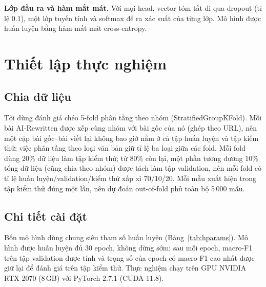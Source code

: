 \documentclass[conference,a4paper]{IEEEtran}
\begin{document}
\textbf{Lớp đầu ra và hàm mất mát.} Với mọi head, vector tóm tắt đi qua dropout (tỉ lệ 0.1), một lớp tuyến tính và softmax để ra xác suất của từng lớp. Mô hình được huấn luyện bằng hàm mất mát cross-entropy.
\section{Thiết lập thực nghiệm}
\label{sec:setup}

\subsection{Chia dữ liệu}
Tôi dùng đánh giá chéo 5-fold phân tầng theo nhóm (StratifiedGroupKFold). Mỗi bài AI-Rewritten được xếp cùng nhóm với bài gốc của nó (ghép theo URL), nên một cặp bài gốc--bài viết lại không bao giờ nằm ở cả tập huấn luyện và tập kiểm thử; việc phân tầng theo loại văn bản giữ tỉ lệ ba loại giữa các fold. Mỗi fold dùng 20\% dữ liệu làm tập kiểm thử; từ 80\% còn lại, một phần tương đương 10\% tổng dữ liệu (cũng chia theo nhóm) được tách làm tập validation, nên mỗi fold có tỉ lệ huấn luyện/validation/kiểm thử xấp xỉ 70/10/20. Mỗi mẫu xuất hiện trong tập kiểm thử đúng một lần, nên dự đoán out-of-fold phủ toàn bộ 5\,000 mẫu.

\subsection{Chi tiết cài đặt}
Bốn mô hình dùng chung siêu tham số huấn luyện (Bảng~\ref{tab:hparams}). Mô hình được huấn luyện đủ 30 epoch, không dừng sớm; sau mỗi epoch, macro-F1 trên tập validation được tính và trọng số của epoch có macro-F1 cao nhất được giữ lại để đánh giá trên tập kiểm thử. Thực nghiệm chạy trên GPU NVIDIA RTX 2070 (8\,GB) với PyTorch 2.7.1 (CUDA 11.8).
\end{document}
